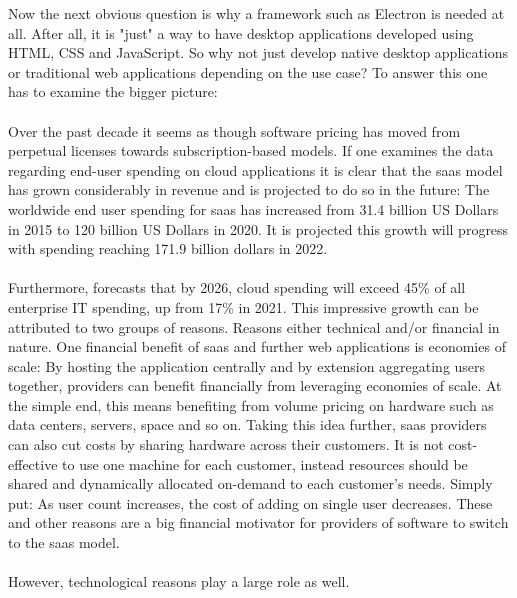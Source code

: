 Now the next obvious question is why a framework such as Electron is needed at all.
After all, it is "just" a way to have desktop applications developed using HTML, CSS and JavaScript.
So why not just develop native desktop applications or traditional web applications depending on the use case?
To answer this one has to examine the bigger picture:\paragraph{}
Over the past decade it seems as though software pricing has moved from perpetual licenses towards subscription-based
models.
If one examines the data regarding end-user spending on cloud applications it is clear that the
\acrfull{saas} model has grown considerably in revenue and is projected to do so in the future:
The worldwide end user spending for \acrshort{saas} has increased from 31.4 billion US Dollars in 2015 to 120
billion US Dollars in 2020.
It is projected this growth will progress with spending reaching 171.9 billion dollars in 2022. \parencite{gartner2021}\paragraph{}
Furthermore, \textcite{gartner2021} forecasts that by 2026, cloud spending will exceed 45\% 
of all enterprise IT spending, up from 17\% in 2021.
This impressive growth can be attributed to two groups of reasons.
Reasons either technical and/or financial in nature.
One financial benefit of \acrshort{saas} and further web applications is economies of scale:
By hosting the application centrally and by extension aggregating users together, providers can benefit financially from
leveraging economies of scale.
At the simple end, this means benefiting from volume pricing on hardware such as data centers, servers, space and so on.
Taking this idea further, \acrshort{saas} providers can also cut costs by sharing hardware across their customers.
It is not cost-effective to use one machine for each customer, instead resources should be shared and dynamically
allocated on-demand to each customer's needs.
Simply put: As user count increases, the cost of adding on single user decreases.
These and other reasons are a big financial motivator for providers of software to switch to the \acrshort{saas} model. \parencite{jacobs2005}\paragraph{}
However, technological reasons play a large role as well.
